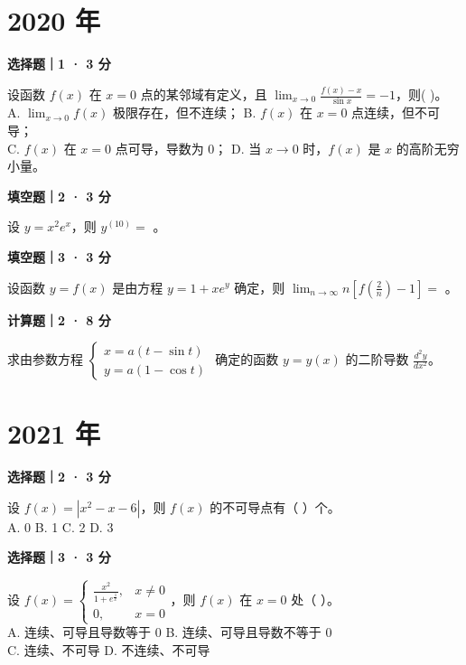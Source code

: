 

\section*{2020 年}


\textbf{选择题｜1 · 3 分}

设函数 $f(x)$ 在 $x = 0$ 点的某邻域有定义，且 $\lim_{x\to0} \frac{f(x)-x}{\sin x} = -1$，则( \quad )。\\
A. $\lim_{x\to0} f(x)$ 极限存在，但不连续； \quad B. $f(x)$ 在 $x = 0$ 点连续，但不可导；\\
C. $f(x)$ 在 $x = 0$ 点可导，导数为 0； \quad D. 当 $x \to 0$ 时，$f(x)$ 是 $x$ 的高阶无穷小量。


\textbf{填空题｜2 · 3 分}

设 $y = x^2e^x$，则 $y^{(10)} = $ \underline{\hspace{3cm}}。


\textbf{填空题｜3 · 3 分}

设函数 $y = f(x)$ 是由方程 $y = 1 + xe^y$ 确定，则 $\lim_{n\to\infty} n \left[ f \left(\frac{2}{n}\right) - 1 \right] = $ \underline{\hspace{3cm}}。


\textbf{计算题｜2 · 8 分}

求由参数方程 $\begin{cases} x = a(t - \sin t) \\ y = a(1 - \cos t) \end{cases}$ 确定的函数 $y = y(x)$ 的二阶导数 $\frac{d^2y}{dx^2}$。


\section*{2021 年}


\textbf{选择题｜2 · 3 分}

设 $f(x) = |x^2 - x - 6|$，则 $f(x)$ 的不可导点有（ \quad ）个。\\
A. 0 \quad B. 1 \quad C. 2 \quad D. 3


\textbf{选择题｜3 · 3 分}

设 $f(x) = \begin{cases} \frac{x^2}{1+e^{\frac{1}{x}}}, & x \neq 0 \\ 0, & x = 0 \end{cases}$，则 $f(x)$ 在 $x = 0$ 处（ \quad ）。\\
A. 连续、可导且导数等于 0 \quad B. 连续、可导且导数不等于 0\\
C. 连续、不可导 \quad D. 不连续、不可导


